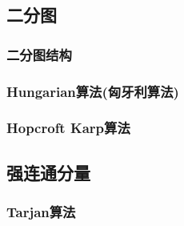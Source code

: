 \subsection{二分图}
\subsubsection{二分图结构}

\subsubsection{Hungarian算法(匈牙利算法)}

\subsubsection{Hopcroft Karp算法}


\subsection{强连通分量}
\subsubsection{Tarjan算法}
